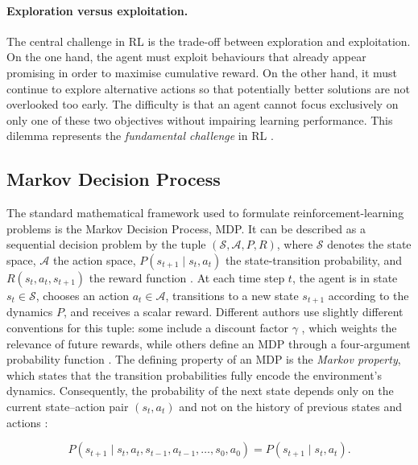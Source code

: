\paragraph{Exploration versus exploitation.}
The central challenge in \ac{RL} is the trade-off between exploration and exploitation. On the one hand, the agent must exploit behaviours that already appear promising in order to maximise cumulative reward. On the other hand, it must continue to explore alternative actions so that potentially better solutions are not overlooked too early. The difficulty is that an agent cannot focus exclusively on only one of these two objectives without impairing learning performance. This dilemma represents the \emph{fundamental challenge} in \ac{RL} \cite{sutton_reinforcement_2020}.

\subsection{Markov Decision Process}
The standard mathematical framework used to formulate reinforcement-learning problems is the Markov Decision Process, \ac{MDP}. It can be described as a sequential decision problem by the tuple $(\mathcal{S}, \mathcal{A}, P, R)$, where $\mathcal{S}$ denotes the state space, $\mathcal{A}$ the action space, $P(s_{t+1}\mid s_t, a_t)$ the state-transition probability, and $R(s_t, a_t, s_{t+1})$ the reward function \cite{hausknecht_deep_2017}. At each time step $t$, the agent is in state $s_t \in \mathcal{S}$, chooses an action $a_t \in \mathcal{A}$, transitions to a new state $s_{t+1}$ according to the dynamics $P$, and receives a scalar reward. Different authors use slightly different conventions for this tuple: some include a discount factor $\gamma$ \cite{ni_recurrent_2022}, which weights the relevance of future rewards, while others define an \ac{MDP} through a four-argument probability function \cite{sutton_reinforcement_2020}.
The defining property of an \ac{MDP} is the \emph{Markov property}, which states that the transition probabilities fully encode the environment's dynamics. Consequently, the probability of the next state depends only on the current state--action pair $(s_t, a_t)$ and not on the history of previous states and actions \cite{sutton_reinforcement_2020}:

\begin{equation}
  P(s_{t+1} \mid s_t, a_t, s_{t-1}, a_{t-1}, \dots, s_0, a_0)
  =
  P(s_{t+1} \mid s_t, a_t).
\end{equation}

